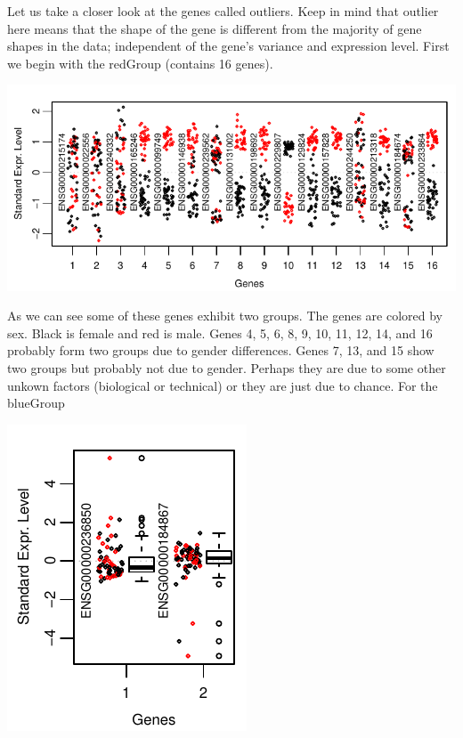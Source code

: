 \documentclass[a4paper, 10pt]{article}\usepackage[]{graphicx}\usepackage[]{color}
\makeatletter
\def\maxwidth{ %
  \ifdim\Gin@nat@width>\linewidth
    \linewidth
  \else
    \Gin@nat@width
  \fi
}
\newenvironment{knitrout}{}{} %
\makeatother
\begin{document}
\begin{knitrout}
{}



\end{knitrout}

\noindent Let us take a closer look at the genes called
outliers. Keep in mind that outlier here means 
that the shape of the gene 
is different from the majority of gene shapes
in the data; independent of the gene's variance and 
expression level.  
First we begin with the redGroup (contains 16 genes).

\begin{knitrout}\small
{}\color{fgcolor}

{\centering \includegraphics[width=\maxwidth]{figure/redGroupPickrell-1} 

}



\end{knitrout}

\noindent As we can see some of these genes
exhibit two groups. 
The genes are colored by sex. 
Black is female and red is male. 
Genes 4, 5, 6, 8, 9, 10, 11, 12, 14, and 16 
probably form two groups due to gender differences.
Genes 7, 13, and 15 show two groups but
probably not due to gender. 
Perhaps they are due to some
other unkown factors (biological or technical) or
they are just due to chance.
For the blueGroup

\begin{knitrout}\small
{}\color{fgcolor}

{\centering \includegraphics[width=\maxwidth]{figure/blueGroupPickrell-1} 

}



\end{knitrout}
\end{document}
